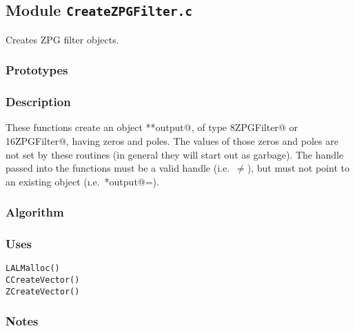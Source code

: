 
\subsection{Module \texttt{CreateZPGFilter.c}}

Creates ZPG filter objects.

\subsubsection{Prototypes}
\vspace{0.1in}


\subsubsection{Description}

These functions create an object \verb@**output@, of type
\verb@COMPLEX8ZPGFilter@ or \verb@COMPLEX16ZPGFilter@, having
\verb@numZeros@ zeros and \verb@numPoles@ poles.  The values of those
zeros and poles are not set by these routines (in general they will
start out as garbage).  The handle passed into the functions must be a
valid handle (i.e.\ \verb@output@$\neq$\verb@NULL@), but must not
point to an existing object (\i.e.\ \verb@*output@=\verb@NULL@).

\subsubsection{Algorithm}

\subsubsection{Uses}
\begin{verbatim}
LALMalloc()
CCreateVector()
ZCreateVector()
\end{verbatim}

\subsubsection{Notes}

